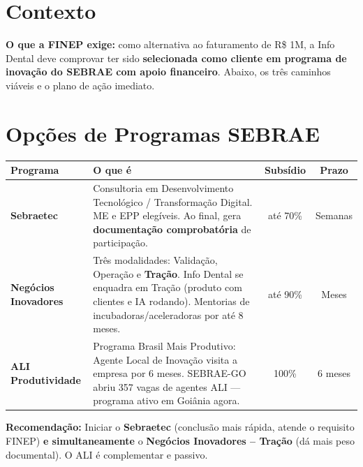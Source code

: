 \documentclass[11pt, a4paper]{article}
\begin{document}
\section{Contexto}

\textcolor{accentColor}{\textbf{O que a FINEP exige:}} como alternativa ao faturamento de R\$ 1M, a Info Dental deve comprovar ter sido \textbf{selecionada como cliente em programa de inovação do SEBRAE com apoio financeiro}. Abaixo, os três caminhos viáveis e o plano de ação imediato.

\vspace{2pt}

\section{Opções de Programas SEBRAE}

\renewcommand{\arraystretch}{1.35}
\begin{table}[H]
    \centering
    \small
    \begin{tabularx}{\textwidth}{@{} l X c c @{}}
        \toprule
        \rowcolor{tableHeader} \textbf{Programa} & \textbf{O que é} & \textbf{Subsídio} & \textbf{Prazo} \\
        \midrule
        \textbf{Sebraetec} & Consultoria em Desenvolvimento Tecnológico / Transformação Digital. ME e EPP elegíveis. Ao final, gera \textbf{documentação comprobatória} de participação. & até 70\% & Semanas \\
        \rowcolor{lightGray}
        \textbf{Negócios Inovadores} & Três modalidades: Validação, Operação e \textbf{Tração}. Info Dental se enquadra em Tração (produto com clientes e IA rodando). Mentorias de incubadoras/aceleradoras por até 8 meses. & até 90\% & Meses \\
        \textbf{ALI Produtividade} & Programa Brasil Mais Produtivo: Agente Local de Inovação visita a empresa por 6 meses. SEBRAE-GO abriu 357 vagas de agentes ALI --- programa ativo em Goiânia agora. & 100\% & 6 meses \\
        \bottomrule
    \end{tabularx}
\end{table}

\vspace{-4pt}

\colorbox{accentColor!10}{%
    \parbox{\dimexpr\textwidth-2\fboxsep}{%
        \small
        \textcolor{accentColor}{\textbf{Recomendação:}} Iniciar o \textbf{Sebraetec} (conclusão mais rápida, atende o requisito FINEP) \textbf{e simultaneamente} o \textbf{Negócios Inovadores -- Tração} (dá mais peso documental). O ALI é complementar e passivo.%
    }%
}
\end{document}
